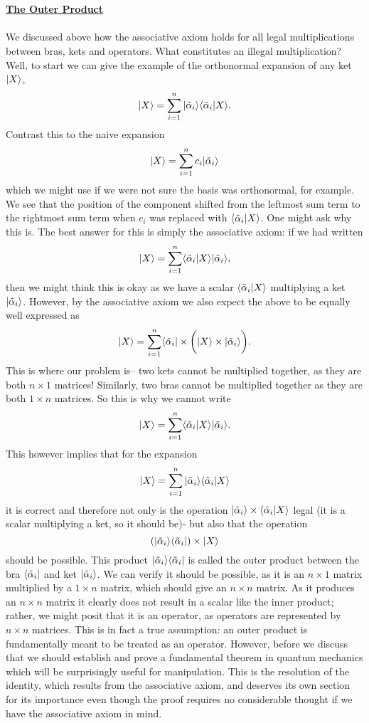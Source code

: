 \\\\
\textbf{\underline{The Outer Product}}
\\\\
We discussed above how the associative axiom holds for all legal multiplications between bras, kets and operators. What constitutes an illegal multiplication? Well, to start we can give the example of the orthonormal expansion of any ket $|X\rangle$,
$$
|X\rangle=\sum_{i=1}^{n}|\tilde{\alpha}_{i}\rangle\langle\tilde{\alpha}_{i}|X\rangle.
$$
Contrast this to the naive expansion
$$
|X\rangle=\sum_{i=1}^{n}c_{i}|\tilde{\alpha}_{i}\rangle
$$
which we might use if we were not sure the basis was orthonormal, for example. We see that the position of the component shifted from the leftmost sum term to the rightmost sum term when $c_{i}$ was replaced with $\langle\tilde{\alpha}_{i}|X\rangle$. One might ask why this is. The best answer for this is simply the associative axiom: if we had written 
$$
|X\rangle=\sum_{i=1}^{n}\langle\tilde{\alpha}_{i}|X\rangle|\tilde{\alpha}_{i}\rangle,
$$
then we might think this is okay as we have a scalar $\langle\tilde{\alpha}_{i}|X\rangle$ multiplying a ket $|\tilde{\alpha}_{i}\rangle$. However, by the associative axiom we also expect the above to be equally well expressed as 
$$
|X\rangle=\sum_{i=1}^{n} \langle\tilde{\alpha}_{i}|\times\biggl(|X\rangle\times|\tilde{\alpha}_{i}\rangle\biggr).
$$ 
This is where our problem is-- two kets cannot be multiplied together, as they are both $n\times 1$ matrices! Similarly, two bras cannot be multiplied together as they are both $1\times n$ matrices. So this is why we cannot write
$$
|X\rangle=\sum_{i=1}^{n}\langle\tilde{\alpha}_{i}|X\rangle|\tilde{\alpha}_{i}\rangle.
$$
This however implies that for the expansion
$$
|X\rangle=\sum_{i=1}^{n}|\tilde{\alpha}_{i}\rangle\langle\tilde{\alpha}_{i}|X\rangle
$$
it is correct and therefore not only is the operation $|\tilde{\alpha}_{i}\rangle\times\langle\tilde{\alpha}_{i}|X\rangle$ legal (it is a scalar multiplying a ket, so it should be)- but also that the operation
$$
\left(|\tilde{\alpha}_{i}\rangle\langle\tilde{\alpha}_{i}|\right)\times |X\rangle
$$
should be possible. This product $|\tilde{\alpha}_{i}\rangle\langle\tilde{\alpha}_{i}|$ is called the outer product between the bra $\langle\tilde{\alpha}_{i}|$ and ket $|\tilde{\alpha}_{i}\rangle$. We can verify it should be possible, as it is an $n\times 1$ matrix multiplied by a $1\times n$ matrix, which should give an $n\times n$ matrix. As it produces an $n\times n$ matrix it clearly does not result in a scalar like the inner product; rather, we might posit that it is an operator, as operators are represented  by $n\times n$ matrices. This is in fact a true assumption: an outer product is fundamentally meant to be treated as an operator. However, before we discuss that we should establish and prove a fundamental theorem in quantum mechanics which will be surprisingly useful for manipulation. This is the resolution of the identity, which results from the associative axiom, and deserves its own section for its importance even though the proof requires no considerable thought if we have the associative axiom in mind.
